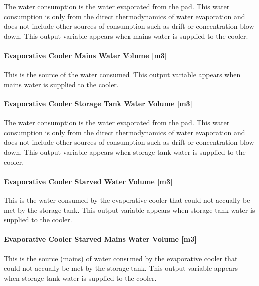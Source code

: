 The water consumption is the water evaporated from the pad. This water consumption is only from the direct thermodynamics of water evaporation and does not include other sources of consumption such as drift or concentration blow down. This output variable appears when mains water is supplied to the cooler.

\paragraph{Evaporative Cooler Mains Water Volume {[}m3{]}}\label{evaporative-cooler-mains-water-volume-m3-4}

This is the source of the water consumed. This output variable appears when mains water is supplied to the cooler.

\paragraph{Evaporative Cooler Storage Tank Water Volume {[}m3{]}}\label{evaporative-cooler-storage-tank-water-volume-m3-4}

The water consumption is the water evaporated from the pad. This water consumption is only from the direct thermodynamics of water evaporation and does not include other sources of consumption such as drift or concentration blow down. This output variable appears when storage tank water is supplied to the cooler.

\paragraph{Evaporative Cooler Starved Water Volume {[}m3{]}}\label{evaporative-cooler-starved-water-volume-m3-4}

This is the water consumed by the evaporative cooler that could not accually be met by the storage tank. This output variable appears when storage tank water is supplied to the cooler.

\paragraph{Evaporative Cooler Starved Mains Water Volume {[}m3{]}}\label{evaporative-cooler-starved-mains-water-volume-m3-4}

This is the source (mains) of water consumed by the evaporative cooler that could not accually be met by the storage tank. This output variable appears when storage tank water is supplied to the cooler.